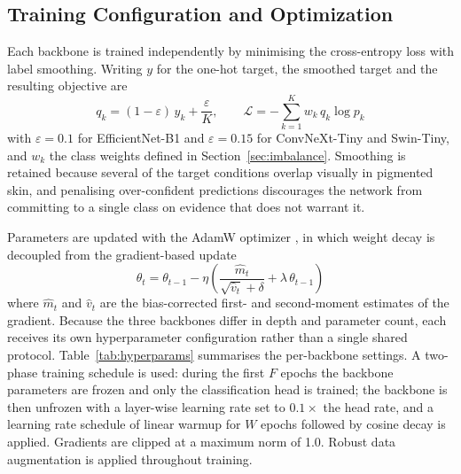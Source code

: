 \documentclass[pdflatex,sn-mathphys-num]{sn-jnl}%
\begin{document}
\subsection{Training Configuration and Optimization}\label{sec:training}

Each backbone is trained independently by minimising the cross-entropy loss with label
smoothing. Writing $y$ for the one-hot target, the smoothed target and the resulting
objective are
\begin{equation}
q_{k} = (1 - \varepsilon)\, y_{k} + \frac{\varepsilon}{K}, \qquad
\mathcal{L} = -\sum_{k=1}^{K} w_{k}\, q_{k} \log p_{k}
\end{equation}
with $\varepsilon = 0.1$ for EfficientNet-B1 and $\varepsilon = 0.15$ for ConvNeXt-Tiny and
Swin-Tiny, and $w_{k}$ the class weights defined in Section~\ref{sec:imbalance}. Smoothing is
retained because several of the target conditions overlap visually in pigmented skin, and
penalising over-confident predictions discourages the network from committing to a single
class on evidence that does not warrant it.

Parameters are updated with the AdamW optimizer \cite{ref26}, in which weight decay is
decoupled from the gradient-based update
\begin{equation}
\theta_{t} = \theta_{t-1} - \eta \left( \frac{\hat{m}_{t}}{\sqrt{\hat{v}_{t}} + \delta}
+ \lambda\, \theta_{t-1} \right)
\end{equation}
where $\hat{m}_{t}$ and $\hat{v}_{t}$ are the bias-corrected first- and second-moment
estimates of the gradient. Because the three backbones differ in depth and parameter count,
each receives its own hyperparameter configuration rather than a single shared protocol.
Table~\ref{tab:hyperparams} summarises the per-backbone settings. A two-phase training
schedule is used: during the first $F$ epochs the backbone parameters are frozen and only the
classification head is trained; the backbone is then unfrozen with a layer-wise learning rate
set to $0.1\times$ the head rate, and a learning rate schedule of linear warmup for $W$ epochs
followed by cosine decay is applied. Gradients are clipped at a maximum norm of 1.0. Robust
data augmentation is applied throughout training.
\end{document}
